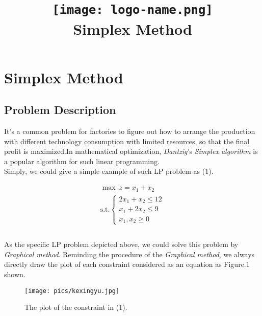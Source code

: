 \documentclass[12pt,a4paper]{article}
\title{\texttt{[image: logo-name.png]}\\[4em]
\textbf{\Huge Simplex Method }\\[6em]}
\author{Yang Chin (2220023347)\thanks{School of Computer Science and Engineering,\newline \indent \indent Macau University of Science and Technology} \and }
\begin{document}
	\maketitle
	\clearpage
\section{Simplex Method}
	\subsection{Problem Description}
	It's a common problem for factories to figure out how to arrange the production with different technology consumption with limited resources, so that the final profit is maximized.In mathematical optimization, \textit{Dantzig}'s \textit{Simplex algorithm} is a popular algorithm for such linear programming.\\
	Simply, we could give a simple example of such LP problem as (1).
	
	\begin{equation}
	\begin{aligned}
	\max \ z = x_1+x_2 \\
	\text{s.t.}
	\left\{
		\begin{array}{lr}
		2x_1+x_2 \leq  12 \\
		x_1+2x_2 \leq  9\\
		x_1,x_2  \geq  0
		\end{array}
	\right.\\
	\end{aligned}
	\end{equation}\\
	\indent As the specific LP problem depicted above, we could solve this problem by \textit{Graphical method}. Reminding the procedure of the \textit{Graphical method}, we always directly draw the plot of each constraint considered as an equation as Figure.1 shown.\label{Fig.1}
	
	\begin{figure}[h]
	\centering 
	\texttt{[image: pics/kexingyu.jpg]}
	\caption{The plot of the constraint in (1).} 
	\label{Fig.1}
	\end{figure}
\end{document}
